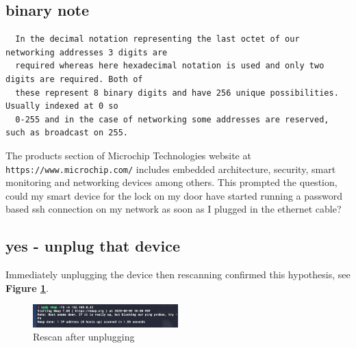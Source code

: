 \documentclass[10pt]{article}
\begin{document}
\subsection*{binary note}
\begin{verbatim}
  In the decimal notation representing the last octet of our networking addresses 3 digits are 
  required whereas here hexadecimal notation is used and only two digits are required. Both of 
  these represent 8 binary digits and have 256 unique possibilities. Usually indexed at 0 so 
  0-255 and in the case of networking some addresses are reserved, such as broadcast on 255.
\end{verbatim}

The products section of Microchip Technologies website at \verb|https://www.microchip.com/| includes embedded architecture,
security, smart monitoring and networking devices among others.\cite{microchip} This prompted the question, could my smart device
for the lock on my door have started running a password based ssh connection on my network as soon as I plugged in the 
ethernet cable?

\subsection*{yes - unplug that device}
Immediately unplugging the device then rescanning confirmed this hypothesis, see \textbf{Figure \ref{down image}}.

\begin{figure}[H]
\centering
\includegraphics[width=0.5\textwidth]{images/down.png}
\caption{Rescan after unplugging}\label{down image}
\end{figure}
\end{document}
